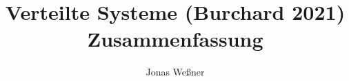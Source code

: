 \documentclass{article}
\begin{document}
\title{Verteilte Systeme (Burchard 2021) Zusammenfassung}
\author{Jonas Weßner}
\maketitle
\tableofcontents
\newpage				%








\end{document}
